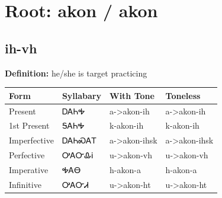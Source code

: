 \documentclass{article}%
\begin{document}
%
\normalsize%
\section*{Root: akon / akon}%
\subsection*{ih-vh}%
\textbf{Definition: }%
he/she is target practicing%
\\[0.5em]%
\begin{tabular}{|l|l|l|l|}%
\hline%
\textbf{Form}&\textbf{Syllabary}&\textbf{With Tone}&\textbf{Toneless}\\%
\hline%
Present&ᎠᎪᏂᎭ&a{-}>akon{-}ih&a{-}>akon{-}ih\\%
1st Present&ᎦᎪᏂᎭ&k{-}akon{-}ih&k{-}akon{-}ih\\%
Imperfective&ᎠᎪᏂᏍᎪᎢ&a{-}>akon{-}ihsk&a{-}>akon{-}ihsk\\%
Perfective&ᎤᎪᏅᎲᎥ&u{-}>akon{-}vh&u{-}>akon{-}vh\\%
Imperative&ᎭᎪᎾ&h{-}akon{-}a&h{-}akon{-}a\\%
Infinitive&ᎤᎪᏅᏗ&u{-}>akon{-}ht&u{-}>akon{-}ht\\%
\hline%
\end{tabular}%
\\[1em]%
\end{document}
